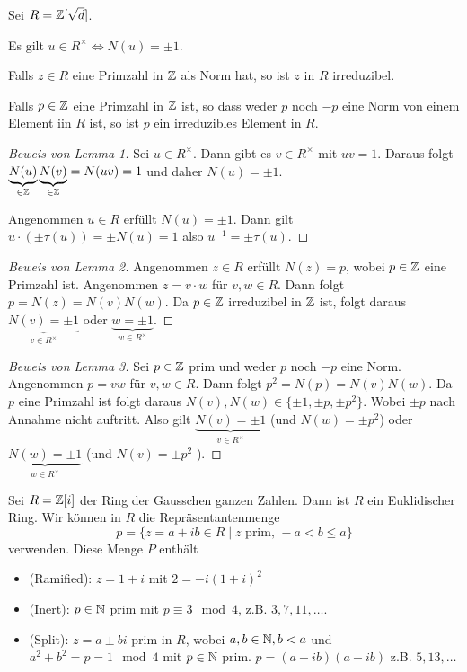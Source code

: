 Sei $R = \mathbb{Z}[\sqrt{d}]$.
\begin{lemma}
	Es gilt $u \in R^{\times} \Leftrightarrow N(u) = \pm 1$.
\end{lemma}

\begin{lemma}
	Falls $z \in R$ eine Primzahl in $\mathbb{Z}$ als Norm hat, so ist $z$ in $R$ irreduzibel.
\end{lemma}

\begin{lemma}
	Falls $p \in \mathbb{Z}$ eine Primzahl in $\mathbb{Z}$ ist, so dass weder  $p$ noch $-p$ eine Norm von einem Element
	iin $R$ ist, so ist $p$ ein irreduzibles Element in $R$.
\end{lemma}

\begin{proof}[Beweis von Lemma 1]
	Sei $u \in R^{\times}$. Dann gibt es $v \in R^{\times}$ mit $uv = 1$. Daraus folgt $\underbrace{N(u)}_{\in \mathbb{Z}} \underbrace{N(v)}_{\in \mathbb{Z}} = N(uv) = 1$ 
	und daher $N(u) = \pm 1$.

	Angenommen  $u \in R$ erfüllt $N(u) = \pm 1$. Dann gilt $u \cdot (\pm \tau(u)) = \pm N(u) = 1$ also $u^{-1} = \pm \tau(u)$.
\end{proof}

\begin{proof}[Beweis von Lemma 2]
	Angenommen $z \in R$ erfüllt $N(z) = p$, wobei $p \in \mathbb{Z}$ eine Primzahl ist.
	Angenommen $z = v\cdot w$ für $v,w \in R$. Dann folgt $p = N(z) = N(v) N(w)$.
	Da $p \in \mathbb{Z}$ irreduzibel in $\mathbb{Z}$ ist, folgt daraus $\underbrace{N(v) = \pm 1}_{v \in R^{\times}}$ oder $\underbrace{w = \pm 1}_{w \in R^{\times}}$.
\end{proof}

\begin{proof}[Beweis von Lemma 3]
	Sei $p \in \mathbb{Z}$ prim und weder $p $ noch $-p$ eine Norm.
	Angenommen $p = vw$ für $v,w \in R$. Dann folgt $p^2 = N(p) = N(v) N(w)$.
	Da $p$ eine Primzahl ist folgt daraus $N(v), N(w) \in \{\pm 1, \pm p, \pm p^2\}$.
	Wobei $\pm p$ nach Annahme nicht auftritt. 
	Also gilt $\underbrace{N(v) = \pm 1}_{v \in R^{\times}}$ (und  $N(w) = \pm p^2$) oder $\underbrace{N(w) = \pm 1}_{w \in R^{\times}}$ (und $N(v) = \pm p^2$ ).
\end{proof}

\begin{theorem}
	Sei $R = \mathbb{Z}[i]$ der Ring der Gausschen ganzen Zahlen.
	Dann ist $R$ ein Euklidischer Ring. Wir können in $R$ die Repräsentantenmenge
	\[
	p = \{z = a + ib \in R \mid z \text{ prim, } -a < b \leq a\} 
	\] 
	verwenden. Diese Menge $P$ enthält
	\begin{itemize}
		\item (Ramified): $z = 1+i$ mit $2 = -i (1+i)^2$
		\item (Inert): $p \in \mathbb{N}$ prim mit $p \equiv 3 \mod 4$,
			z.B. $3,7,11,\ldots$.
		\item (Split): $z = a \pm b i$ prim in $R$, wobei $a,b \in \mathbb{N}, b < a$ und
			$a^2 + b^2 = p = 1 \mod 4$ mit $p \in \mathbb{N}$ prim. $p = (a+ib)(a-ib)$ 
			z.B. $5,13,\ldots$
	\end{itemize}
\end{theorem}

